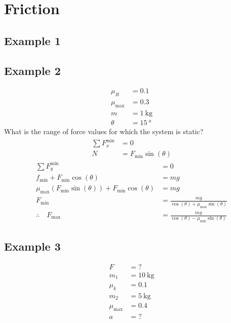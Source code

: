 \documentclass{article}
\begin{document}
\newcommand{\hr}{\par\noindent\rule{\textwidth}{0.4pt}}

\newcommand{\bc}[1]{
	\begin{equation*}
		\begin{boxed}
			{#1}
		\end{boxed}
	\end{equation*}
}

\newcommand{\cond}[2]{
	\ifmmode
		{#1} \quad {#2}
	\else
		$$ {#1} \quad {#2} $$
	\fi
}

\section{Friction}

\subsection{Example 1}

\subsection{Example 2}
\begin{align*}
	\mu_R & = 0.1 \\
	\mu_{\text{max}} & = 0.3 \\
	m & = \SI{1}{\kilogram} \\
	\theta & = \SI{15}{\degree}
\end{align*}
What is the range of force values for which the system is static?
\begin{align*}
	\sum F_x^{\text{min}} & = 0 \\
	N & = F_{\text{min}}\sin(\theta)
\end{align*}
\begin{align*}
	\sum F_y^{\text{min}} & = 0 \\
	f_{\text{min}} + F_{\text{min}}\cos(\theta) & = mg \\
	\mu_{\text{max}}(F_{\text{min}}\sin(\theta)) + F_{\text{min}}\cos(\theta) & = mg \\
	F_{\text{min}} & = \frac{mg}{\cos(\theta) + \mu_{\text{max}}\sin(\theta)} \\
	\therefore \quad F_{\text{max}} & = \frac{mg}{\cos(\theta) - \mu_{\text{min}}\sin(\theta)}
\end{align*}

\subsection{Example 3}
\begin{align*}
	F & = ? \\
	m_1 & = \SI{10}{\kilogram} \\
	\mu_k & = 0.1 \\
	m_2 & = \SI{5}{\kilogram} \\
	\mu_{\text{max}} & = 0.4 \\
	a & = ?
\end{align*}
\end{document}
